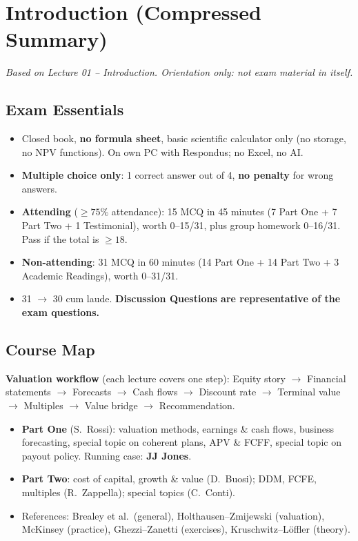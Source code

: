 \chapter[Introduction (Summary)]{Introduction (Compressed Summary)}

\emph{Based on Lecture 01 -- Introduction. Orientation only: not exam material in itself.}

\section{Exam Essentials}

\begin{keybox}
\begin{itemize}[leftmargin=*]
  \item Closed book, \textbf{no formula sheet}, basic scientific calculator only (no storage, no NPV functions). On own PC with Respondus; no Excel, no AI.
  \item \textbf{Multiple choice only}: 1 correct answer out of 4, \textbf{no penalty} for wrong answers.
  \item \textbf{Attending} ($\geq 75\%$ attendance): 15 MCQ in 45 minutes (7 Part One + 7 Part Two + 1 Testimonial), worth 0--15/31, plus group homework 0--16/31. Pass if the total is $\geq 18$.
  \item \textbf{Non-attending}: 31 MCQ in 60 minutes (14 Part One + 14 Part Two + 3 Academic Readings), worth 0--31/31.
  \item 31 $\to$ 30 cum laude. \textbf{Discussion Questions are representative of the exam questions.}
\end{itemize}
\end{keybox}

\section{Course Map}

\textbf{Valuation workflow} (each lecture covers one step): Equity story $\to$ Financial statements $\to$ Forecasts $\to$ Cash flows $\to$ Discount rate $\to$ Terminal value $\to$ Multiples $\to$ Value bridge $\to$ Recommendation.

\begin{itemize}
  \item \textbf{Part One} (S.\ Rossi): valuation methods, earnings \& cash flows, business forecasting, special topic on coherent plans, APV \& FCFF, special topic on payout policy. Running case: \textbf{JJ Jones}.
  \item \textbf{Part Two}: cost of capital, growth \& value (D.\ Buosi); DDM, FCFE, multiples (R.\ Zappella); special topics (C.\ Conti).
  \item References: Brealey et al.\ (general), Holthausen--Zmijewski (valuation), McKinsey (practice), Ghezzi--Zanetti (exercises), Kruschwitz--L\"offler (theory).
\end{itemize}

